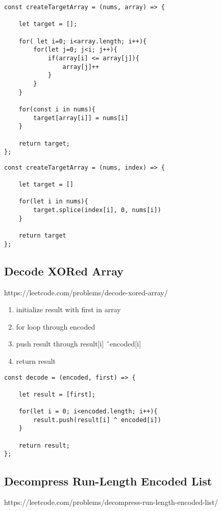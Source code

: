 \documentclass[10pt]{article}
\begin{document}
\begin{lstlisting}[title=Solution createTargetArray, captionpos=t]
const createTargetArray = (nums, array) => {

    let target = [];
    
    for( let i=0; i<array.length; i++){
        for(let j=0; j<i; j++){
            if(array[i] <= array[j]){
                array[j]++
            }
        }
    }
    
    for(const i in nums){
        target[array[i]] = nums[i]
    }
    
    return target;
};
\end{lstlisting}

\begin{lstlisting}[title=Solution createTargetArray with splice(), captionpos=t]
const createTargetArray = (nums, index) => {
    
    let target = []
    
    for(let i in nums){
        target.splice(index[i], 0, nums[i])
    }
        
    return target
};
\end{lstlisting}
\medskip %

\pagebreak
\medskip %
\subsection{Decode XORed Array}
https://leetcode.com/problems/decode-xored-array/

\begin{enumerate}
	\item initialize result with first in array
	\item for loop through encoded
	\item push result through result[i] \^\ encoded[i]
	\item return result
\end{enumerate}

\begin{lstlisting}[title=Solution decode, captionpos=t]
const decode = (encoded, first) => {

    let result = [first];
    
    for(let i = 0; i<encoded.length; i++){
        result.push(result[i] ^ encoded[i])
    }
    
    return result;
};
\end{lstlisting}
\medskip %


\pagebreak
\medskip %
\subsection{Decompress Run-Length Encoded List}
https://leetcode.com/problems/decompress-run-length-encoded-list/
\end{document}
